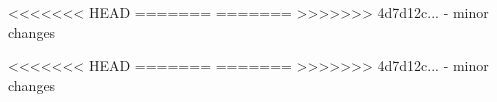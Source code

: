 \documentclass[runningheads,a4paper]{llncs}
\begin{document}
\newpage

<<<<<<< HEAD
=======
%
=======
>>>>>>> 4d7d12c... - minor changes
%

%
\tableofcontents
%

%
\newpage
\listoffigures
{}
%

%
\newpage
\listoftables
{}

%

%







%

%
%

\renewcommand*{\glsclearpage}{}
\printglossaries
%

%
\appendix

<<<<<<< HEAD
=======
%
=======
>>>>>>> 4d7d12c... - minor changes
%

%


%
\end{document}
